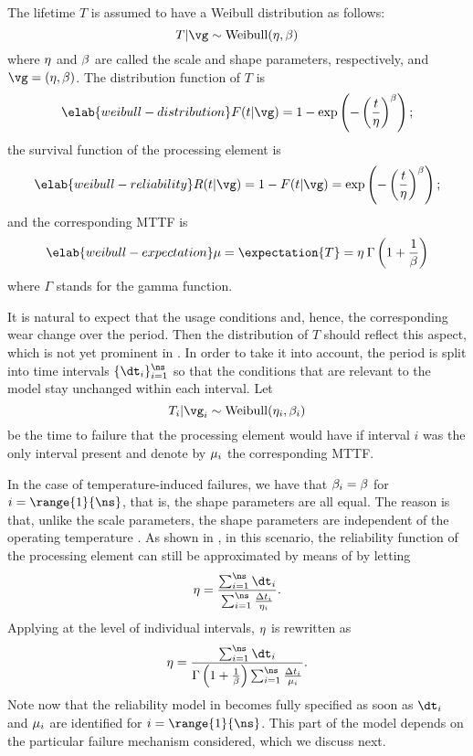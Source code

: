 The lifetime $T$ is assumed to have a Weibull distribution as follows:
\[
  T | \vg \sim \mathrm{Weibull}(\scale, \shape)
\]
where $\eta$ and $\beta$ are called the scale and shape parameters,
respectively, and $\vg = (\scale, \shape)$. The distribution function of $T$ is
\begin{equation} \elab{weibull-distribution}
  F(t | \vg) = 1 - \exp\left(-\left(\frac{t}{\scale}\right)^\shape\right);
\end{equation}
the survival function of the processing element is
\begin{equation} \elab{weibull-reliability}
  R(t | \vg) = 1 - F(t | \vg) = \exp\left(-\left(\frac{t}{\scale}\right)^\shape\right);
\end{equation}
and the corresponding \ac{MTTF} is
\begin{equation} \elab{weibull-expectation}
  \mean = \expectation{T} = \scale \: \Gamma\left(1 + \frac{1}{\shape}\right)
\end{equation}
where $\Gamma$ stands for the gamma function.

It is natural to expect that the usage conditions and, hence, the corresponding
wear change over the period. Then the distribution of $T$ should reflect this
aspect, which is not yet prominent in . In order to
take it into account, the period is split into \ns time intervals $\{ \dt_i
\}_{i = 1}^\ns$ so that the conditions that are relevant to the model stay
unchanged within each interval. Let
\[
  T_i | \vg_i \sim \mathrm{Weibull}(\scale_i, \shape_i)
\]
be the time to failure that the processing element would have if interval $i$
was the only interval present and denote by $\mu_i$ the corresponding
\ac{MTTF}.

In the case of temperature-induced failures, we have that $\beta_i = \beta$
for $i = \range{1}{\ns}$, that is, the shape parameters are all equal. The
reason is that, unlike the scale parameters, the shape parameters are
independent of the operating temperature \cite{chang2006}. As shown in
\cite{xiang2010}, in this scenario, the reliability function of the processing
element can still be approximated by means of  by
letting
\[
  \scale = \frac{\sum_{i = 1}^\ns \dt_i}{\sum_{i = 1}^\ns \frac{\Delta t_i}{\scale_i}}.
\]
Applying  at the level of individual intervals,
$\eta$ is rewritten as
\[
  \scale = \frac{\sum_{i = 1}^\ns \dt_i}{\Gamma\left(1 + \frac{1}{\shape}\right) \sum_{i = 1}^\ns \frac{\Delta t_i}{\mean_i}}.
\]
Note now that the reliability model in  becomes fully
specified as soon as $\dt_i$ and $\mu_i$ are identified for $i =
\range{1}{\ns}$. This part of the model depends on the particular failure
mechanism considered, which we discuss next.

